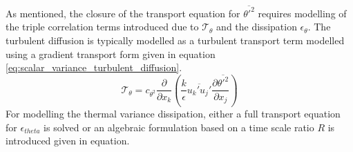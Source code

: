 As mentioned, the closure of the transport equation for $\overline{\theta'^{2}}$ requires modelling of the triple correlation terms introduced due to $\mathcal{T_{\theta}}$ and the dissipation $\epsilon_{\theta}$. The turbulent diffusion is typically modelled as a turbulent transport term modelled using a gradient transport form given in equation \ref{eq:scalar_variance_turbulent_diffusion}. 
\begin{equation}
\label{eq:scalar_variance_turbulent_diffusion}
\mathcal{T_{\theta}} = c_{\theta^{2}}\frac{\partial}{\partial x_{k}}\left(\frac{k}{\epsilon}\overline{u_{k}'u_{j}'}\frac{\partial \overline{\theta'^{2}}}{\partial x_{j}}\right)
\end{equation} 
For modelling the thermal variance dissipation, either a full transport equation for $\epsilon_{theta}$ is solved or an algebraic formulation based on a time scale ratio $R$ is introduced given in equation. 